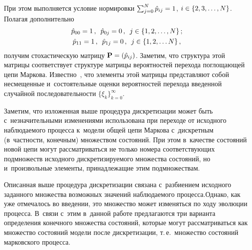 \begin{multicols}{2}
  При этом выполняется условие нормировки $\sum\nolimits^N_{j=0} 
\hat{p}_{ij} \hm=1$, $i\hm\in \{2,3,\ldots, N\}$. Полагая дополнительно 
  \begin{gather*}
  \hat{p}_{00} =1\,,\enskip \hat{p}_{0j}=0\,,\enskip j\in \{1,2,\ldots , N\}\,;\\
  \hat{p}_{11}=1\,,\enskip \hat{p}_{1j}=0\,,\enskip j\in \{1,2,\ldots N\}\,,
  \end{gather*}
получим стохастическую матрицу $\mathbf{P}\hm= \left( \hat{p}_{ij}\right)$. 
Заметим, что структура этой матрицы соответствует структуре матрицы 
вероятностей перехода поглощающей цепи Маркова. Известно~\cite{4-shn, 5-shn}, 
что элементы этой матрицы представляют собой несмещенные и~состоятельные 
оценки вероятностей перехода введенной случайной последовательности 
$\{\xi_k\}^\infty_{k=0}$. 
  
  Заметим, что изложенная выше процедура дискретизации может быть 
с~незначительными изменениями использована при переходе от исходного 
наблюдаемого процесса к~модели общей цепи Маркова с~дискретным  
(в~част\-ности, конечным) множеством состояний. При этом в~качестве 
состояний новой цепи могут рассматриваться не только номера 
соответствующих подмножеств исходного дискретизируемого множества 
состояний, но и~произвольные элементы, принадлежащие этим подмножествам.
  
  Описанная выше процедура дискретизации связана с~разбиением исходного 
заданного множества возможных значений наблюдаемого процесса.\linebreak Однако, 
как уже отмечалось во введении, это множество может изменяться по ходу 
эволюции процесса. В~связи с~этим в~данной работе \mbox{предлагаются} три варианта 
определения конечного множества состояний, которые могут рассматриваться 
как множество состояний модели после дискретизации, т.\,е.\ множество 
состояний марковского процесса.
{

}

\smallskip
  

\end{multicols}
